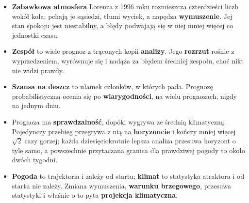 \begin{summarybox}
\begin{itemize}
\item \textbf{Zabawkowa atmosfera} Lorenza z 1996 roku rozmieszcza
  czterdzieści liczb wokół koła; pchają je sąsiedzi, tłumi wyciek, a napędza
  \textbf{wymuszenie}. Jej stan spokoju jest niestabilny, a błędy podwajają
  się w niej mniej więcej co  jednostki czasu.
\item \textbf{Zespół} to wiele prognoz z trąconych kopii \textbf{analizy}. Jego
  \textbf{rozrzut} rośnie z wyprzedzeniem, wyrównuje się i nadąża za błędem
  średniej zespołu, choć nikt nie widzi prawdy.
\item \textbf{Szansa na deszcz} to ułamek członków, w których pada. Prognozę
  probabilistyczną ocenia się po \textbf{wiarygodności}, na wielu
  prognozach, nigdy na jednym dniu.
\item Prognoza ma \textbf{sprawdzalność}, dopóki wygrywa ze średnią
  klimatyczną. Pojedynczy przebieg przegrywa z nią na \textbf{horyzoncie} i
  kończy mniej więcej $\sqrt{2}$ razy gorzej; każda dziesięciokrotnie lepsza
  analiza przesuwa horyzont o tyle samo, a powszechnie przytaczana granica
  dla prawdziwej pogody to około dwóch tygodni.
\item \textbf{Pogoda} to trajektoria i zależy od startu; \textbf{klimat} to
  statystyka atraktora i od startu nie zależy. Zmiana wymuszenia,
  \textbf{warunku brzegowego}, przesuwa statystyki i właśnie o to pyta
  \textbf{projekcja klimatyczna}.
\end{itemize}
\end{summarybox}

\canyou

